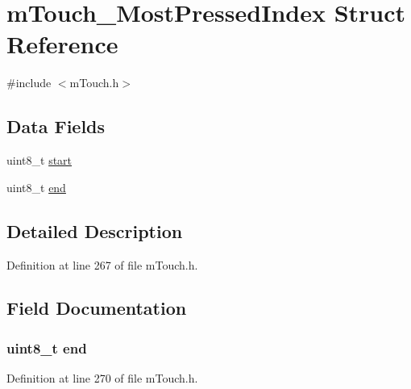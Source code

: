 \hypertarget{structm_touch___most_pressed_index}{}\section{m\+Touch\+\_\+\+Most\+Pressed\+Index Struct Reference}
\label{structm_touch___most_pressed_index}


{\ttfamily \#include $<$m\+Touch.\+h$>$}

\subsection*{Data Fields}
\begin{DoxyCompactItemize}
\item 
uint8\+\_\+t \hyperlink{structm_touch___most_pressed_index_a7dc2499e4825a78e484bb388ab29dc1d}{start}
\item 
uint8\+\_\+t \hyperlink{structm_touch___most_pressed_index_ad0970d0a1eb91451bab00fc13a27c201}{end}
\end{DoxyCompactItemize}


\subsection{Detailed Description}


Definition at line 267 of file m\+Touch.\+h.



\subsection{Field Documentation}
\hypertarget{structm_touch___most_pressed_index_ad0970d0a1eb91451bab00fc13a27c201}{}
\subsubsection[{end}]{\setlength{\rightskip}{0pt plus 5cm}uint8\+\_\+t end}\label{structm_touch___most_pressed_index_ad0970d0a1eb91451bab00fc13a27c201}


Definition at line 270 of file m\+Touch.\+h.

\hypertarget{structm_touch___most_pressed_index_a7dc2499e4825a78e484bb388ab29dc1d}{}
